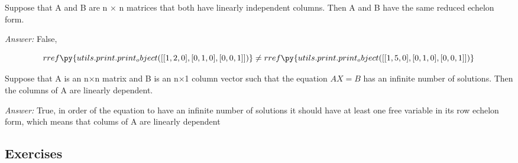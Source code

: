 \documentclass[letterpaper]{article}
\newcommand{\ans}{\textit{Answer: }}
\newenvironment{question}[2][Question]{\begin{trivlist}
\item[\hskip \labelsep {\bfseries #1}\hskip \labelsep {\bfseries #2.}]}{\end{trivlist}}
\newcommand{\printobj}[1]{\py{utils.print.print_object(#1)}}
\begin{document}
\begin{question}{2.3}
    Suppose that A and B are n × n matrices that both have linearly independent
    columns. Then A and B have the same reduced echelon form.

    \ans False, 

    $$
    rref \printobj{[
        [1, 2, 0],
        [0, 1, 0],
        [0, 0, 1]
    ]}
    \neq
    rref \printobj{[
        [1, 5, 0],
        [0, 1, 0],
        [0, 0, 1]
    ]}
    $$

\end{question}

\begin{question}{2.4}
    Suppose that A is an n×n matrix and B is an n×1 column vector such that 
    the equation $AX = B$ has an infinite number of solutions. Then the columns
    of A are linearly dependent.

    \ans True, in order of the equation to have an infinite number of solutions
    it should have at least one free variable in its row echelon form, which means 
    that colums of A are linearly dependent
\end{question}

\subsection{Exercises}
\end{document}
